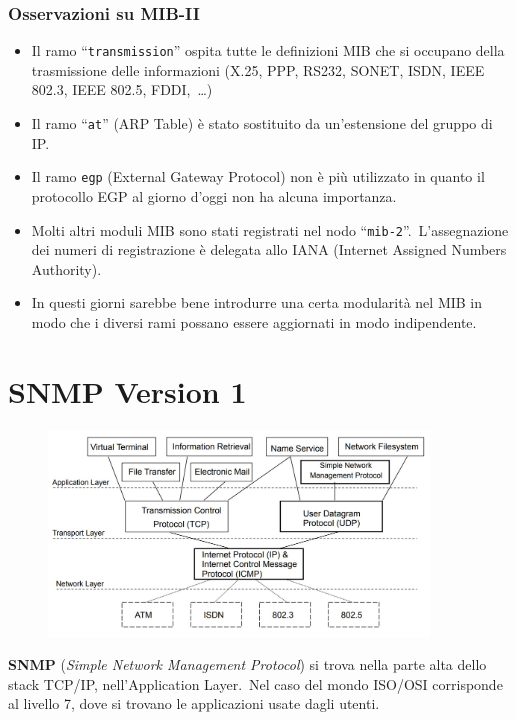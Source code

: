 \subsubsection{Osservazioni su MIB-II}

\begin{itemize}
    \item Il ramo ``\texttt{transmission}'' ospita tutte le definizioni MIB che si occupano della trasmissione delle informazioni (X.25, PPP, RS232, SONET, ISDN, IEEE 802.3, IEEE 802.5, FDDI,\ \dots)
    \item Il ramo ``\texttt{at}'' (ARP Table) è stato sostituito da un'estensione del gruppo di IP.
    \item Il ramo \texttt{egp} (External Gateway Protocol) non è più utilizzato in quanto il protocollo EGP al giorno d'oggi non ha alcuna importanza.
    \item Molti altri moduli MIB sono stati registrati nel nodo ``\texttt{mib-2}''.\ L'assegnazione dei numeri di registrazione è delegata allo IANA (Internet Assigned Numbers Authority).
    \item In questi giorni sarebbe bene introdurre una certa modularità nel MIB in modo che i diversi rami possano essere aggiornati in modo indipendente.\
\end{itemize}

\section{SNMP Version 1}

\begin{figure}[H]
    \centering
    \includegraphics[width=0.9\textwidth]{immagini/SNMP.jpg}
\end{figure}

\textbf{SNMP} (\textit{Simple Network Management Protocol}) si trova nella parte alta dello stack TCP{\slash}IP, nell'Application Layer.\
Nel caso del mondo ISO{\slash}OSI corrisponde al livello 7, dove si trovano le applicazioni usate dagli utenti.\

